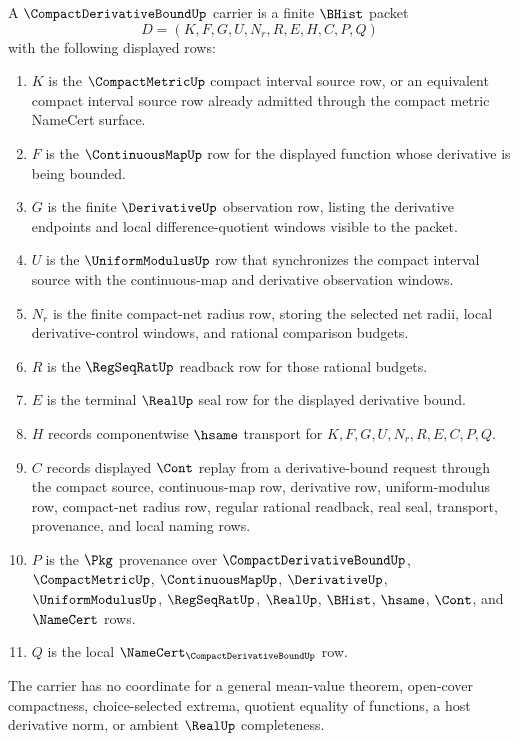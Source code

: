 \begin{definition}
\label{def:compact-derivative-bound-carrier}
A $\CompactDerivativeBoundUp$ carrier is a finite $\BHist$ packet
$$
D=(K,F,G,U,N_r,R,E,H,C,P,Q)
$$
with the following displayed rows:
\begin{enumerate}
\item $K$ is the $\CompactMetricUp$ compact interval source row, or an equivalent compact interval source row already admitted through the compact metric NameCert surface.
\item $F$ is the $\ContinuousMapUp$ row for the displayed function whose derivative is being bounded.
\item $G$ is the finite $\DerivativeUp$ observation row, listing the derivative endpoints and local difference-quotient windows visible to the packet.
\item $U$ is the $\UniformModulusUp$ row that synchronizes the compact interval source with the continuous-map and derivative observation windows.
\item $N_r$ is the finite compact-net radius row, storing the selected net radii, local derivative-control windows, and rational comparison budgets.
\item $R$ is the $\RegSeqRatUp$ readback row for those rational budgets.
\item $E$ is the terminal $\RealUp$ seal row for the displayed derivative bound.
\item $H$ records componentwise $\hsame$ transport for $K,F,G,U,N_r,R,E,C,P,Q$.
\item $C$ records displayed $\Cont$ replay from a derivative-bound request through the compact source, continuous-map row, derivative row, uniform-modulus row, compact-net radius row, regular rational readback, real seal, transport, provenance, and local naming rows.
\item $P$ is the $\Pkg$ provenance over $\CompactDerivativeBoundUp$, $\CompactMetricUp$, $\ContinuousMapUp$, $\DerivativeUp$, $\UniformModulusUp$, $\RegSeqRatUp$, $\RealUp$, $\BHist$, $\hsame$, $\Cont$, and $\NameCert$ rows.
\item $Q$ is the local $\NameCert_{\CompactDerivativeBoundUp}$ row.
\end{enumerate}
The carrier has no coordinate for a general mean-value theorem, open-cover compactness, choice-selected extrema, quotient equality of functions, a host derivative norm, or ambient $\RealUp$ completeness.
\end{definition}

